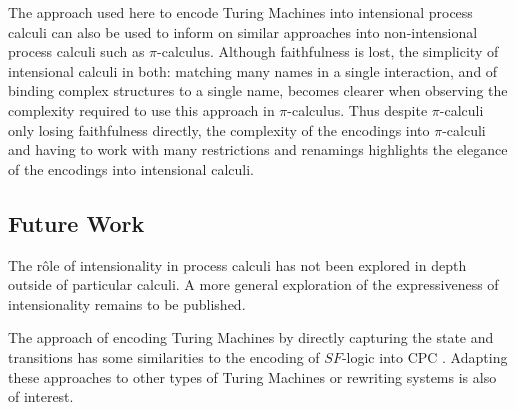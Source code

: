 \documentclass[submission,copyright,creativecommons]{eptcs}
\begin{document}
The approach used here to encode Turing Machines into intensional process calculi
can also be used to inform on similar approaches into non-intensional process
calculi such as $\pi$-calculus. Although faithfulness is lost, the
simplicity of intensional calculi in both: matching many names in a single interaction,
and of binding complex structures to a single name, becomes clearer when observing
the complexity required to use this approach in $\pi$-calculus.
Thus despite $\pi$-calculi only losing faithfulness directly, the complexity of
the encodings into $\pi$-calculi and having to work with many restrictions and
renamings highlights the elegance of the
encodings into intensional calculi.

\subsection*{Future Work}

The r\^ole of intensionality in process calculi has not been explored in depth
outside of particular calculi. A more general exploration of the expressiveness
of intensionality remains to be published.

The approach of encoding Turing Machines by directly capturing the state and
transitions has some similarities to the encoding of $SF$-logic \cite{jay2011}
into CPC \cite{GivenWilsonPhD}.
Adapting these approaches to other types of Turing Machines or rewriting
systems is also of interest.




\end{document}
